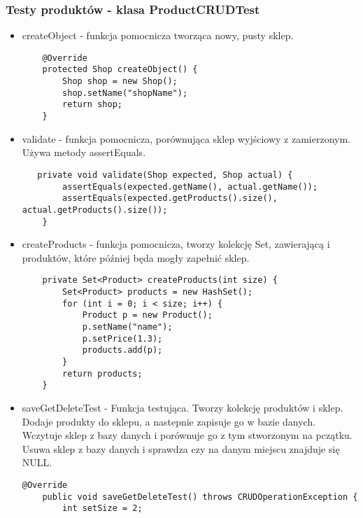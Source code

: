 \documentclass[a4paper,11pt,notitlepage]{article}
\begin{document}
\subsubsection{Testy produktów - klasa ProductCRUDTest}
\begin{itemize}
\item createObject - funkcja pomocnicza tworząca nowy, pusty sklep.
\begin{footnotesize}\begin{verbatim}
    @Override
    protected Shop createObject() {
        Shop shop = new Shop();
        shop.setName("shopName");
        return shop;
    }
\end{verbatim}\end{footnotesize}
\item validate - funkcja pomocnicza, porównująca sklep wyjściowy z zamierzonym. Używa metody assertEquals. 
\begin{footnotesize}\begin{verbatim}
   private void validate(Shop expected, Shop actual) {
        assertEquals(expected.getName(), actual.getName());
        assertEquals(expected.getProducts().size(), actual.getProducts().size());
    }
\end{verbatim}\end{footnotesize}
\item createProducts - funkcja pomocnicza, tworzy kolekcję Set, zawierającą i produktów, które później będa mogły zapełnić sklep.
\begin{footnotesize}\begin{verbatim}
    private Set<Product> createProducts(int size) {
        Set<Product> products = new HashSet();
        for (int i = 0; i < size; i++) {
            Product p = new Product();
            p.setName("name");
            p.setPrice(1.3);
            products.add(p);
        }
        return products;
    }
\end{verbatim}\end{footnotesize}
\item saveGetDeleteTest - Funkcja testująca. Tworzy kolekcję produktów i sklep. Dodaje produkty do sklepu, a nastepnie zapisuje go w bazie danych. Wczytuje sklep z bazy danych i porównuje go z tym stworzonym na pczątku. Usuwa sklep z bazy danych i sprawdza czy na danym miejscu znajduje się NULL.
\begin{footnotesize}\begin{verbatim}
@Override
    public void saveGetDeleteTest() throws CRUDOperationException {
        int setSize = 2;


\end{verbatim}
\end{footnotesize}
\end{itemize}
\end{document}
